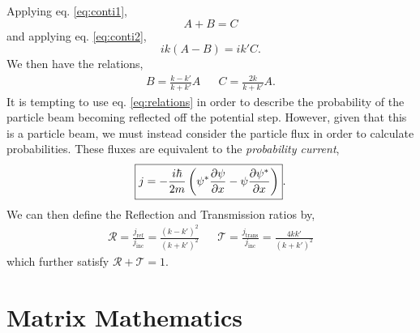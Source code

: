 \documentclass{book}
\begin{document}
Applying eq. \eqref{eq:conti1},
\begin{equation}
	A + B = C
\end{equation}
and applying eq. \eqref{eq:conti2},
\begin{equation}
	ik(A - B) = ik'C.
\end{equation}
We then have the relations,
\begin{align}
	B = \frac{k-k'}{k+k'}A && C = \frac{2k}{k+k'}A. \label{eq:relations}
\end{align}
It is tempting to use eq. \eqref{eq:relations} in order to describe the probability of the particle beam becoming reflected off the potential step. However, given that this is a particle beam, we must instead consider the particle flux in order to calculate probabilities. These fluxes are equivalent to the \textit{probability current},
\begin{equation}
	\boxed{j = -\frac{i\hbar}{2m}\left(\psi^*\pdv{\psi}{x} - \psi \pdv{\psi^*}{x}\right)}.
\end{equation}
We can then define the Reflection and Transmission ratios by,
\begin{align}
	\boxed{\mathcal{R} = \frac{j_{\text{ref}}}{j_{\text{inc}}} = \frac{(k-k')^2}{(k+k')^2}} && \boxed{\mathcal{T} = \frac{j_{\text{trans}}}{j_{\text{inc}}} = \frac{4kk'}{(k+k')^2}}
\end{align}
which further satisfy $\mathcal{R} + \mathcal{T} = 1$.
\appendix
\chapter {Matrix Mathematics}
\end{document}

